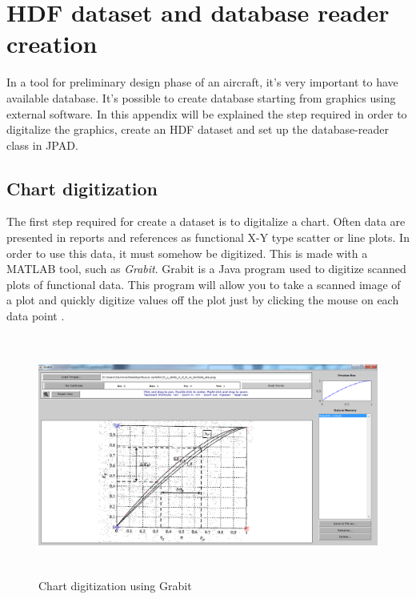 \chapter{HDF dataset and database reader creation}
\label{app:appendice1}

In a tool for preliminary design phase of an aircraft, it's very important to have available database. It's possible to create database starting from graphics using external software. In this appendix will be explained the step required in order to digitalize the graphics, create an HDF dataset and set up the database-reader class in JPAD.

\section{Chart digitization}
\label{secA.1}

The first step required for create a dataset is to digitalize a chart. Often data are presented in reports and references as functional X-Y type scatter or line plots. In order to use this data, it must somehow be digitized. This is made with a MATLAB tool, such as \emph{Grabit}. Grabit is a Java program used to digitize scanned plots of functional data. This program will allow you to take a scanned image of a plot and quickly digitize values off the plot just by clicking the mouse on each data point \cite{Grabit}.

\begin{figure}[htbp]
\centering
\includegraphics[height=7.9cm]{Immagini/Appendice1/Grabit} 
\caption{Chart digitization using Grabit}
\label{angles}
\end{figure} 

